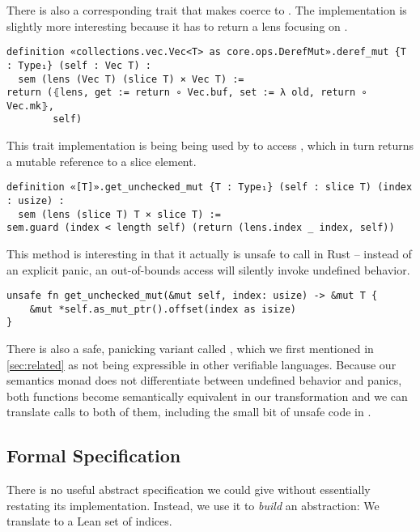 There is also a corresponding  trait that makes  coerce to . The implementation is slightly more
interesting because it has to return a lens focusing on .

\begin{verbatim}
definition «collections.vec.Vec<T> as core.ops.DerefMut».deref_mut {T : Type₁} (self : Vec T) :
  sem (lens (Vec T) (slice T) × Vec T) :=
return (⦃lens, get := return ∘ Vec.buf, set := λ old, return ∘ Vec.mk⦄,
        self)
\end{verbatim}

This trait implementation is being being used by  to
access , which in turn returns a mutable reference to a slice
element.

\begin{verbatim}
definition «[T]».get_unchecked_mut {T : Type₁} (self : slice T) (index : usize) :
  sem (lens (slice T) T × slice T) :=
sem.guard (index < length self) (return (lens.index _ index, self))
\end{verbatim}

This method is interesting in that it actually is unsafe to call in Rust --
instead of an explicit panic, an out-of-bounds access will silently invoke
undefined behavior.

\begin{verbatim}
unsafe fn get_unchecked_mut(&mut self, index: usize) -> &mut T {
    &mut *self.as_mut_ptr().offset(index as isize)
}
\end{verbatim}

There is also a safe, panicking variant called , which we
first mentioned in \autoref{sec:related} as not being expressible in other
verifiable languages. Because our semantics monad does not differentiate between
undefined behavior and panics, both functions become semantically equivalent in
our transformation and we can translate calls to both of them, including the
small bit of unsafe code in .

\subsection{Formal Specification}

There is no useful abstract specification we could give  without
essentially restating its implementation. Instead, we use it to \emph{build} an
abstraction: We translate  to a Lean set of indices.

